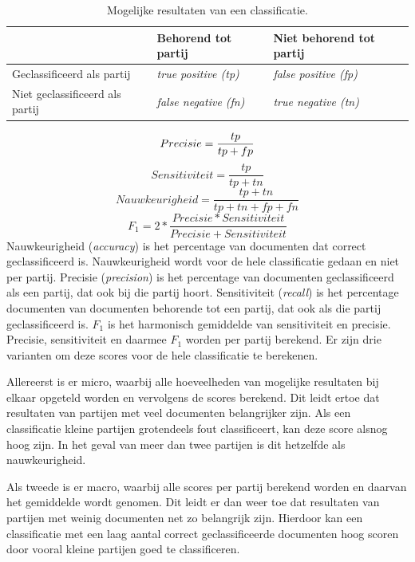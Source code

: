 \begin{table}[H]
\label{tab:scores}
\centering
\caption{Mogelijke resultaten van een classificatie.}
\begin{tabular}{l|l|l}
 & Behorend tot partij & Niet behorend tot partij\\ \hline
Geclassificeerd als partij &   \textit{true positive (tp)} & \textit{false positive (fp)} \\ \hline
Niet geclassificeerd als partij & \textit{false negative (fn)} & \textit{true negative (tn)} \\
\end{tabular}
\end{table}
\begin{equation}
    Precisie = \frac{tp}{tp + fp}\\
\end{equation}
\begin{equation}
    Sensitiviteit = \frac{tp}{tp + tn}
\end{equation}
\begin{equation}
    Nauwkeurigheid = \frac{tp + tn}{tp + tn + fp + fn}
\end{equation}
\begin{equation}
    F_1 = 2 * \frac{Precisie * Sensitiviteit}{Precisie + Sensitiviteit}
\end{equation}
Nauwkeurigheid (\textit{accuracy}) is het percentage van documenten dat correct geclassificeerd is. Nauwkeurigheid wordt voor de hele classificatie gedaan en niet per partij. Precisie (\textit{precision}) is het percentage van documenten geclassificeerd als een partij, dat ook bij die partij hoort. Sensitiviteit (\textit{recall}) is het percentage documenten van documenten behorende tot een partij, dat ook als die partij geclassificeerd is. $F_1$ is het harmonisch gemiddelde van sensitiviteit en precisie. Precisie, sensitiviteit en daarmee $F_1$ worden per partij berekend. Er zijn drie varianten om deze scores voor de hele classificatie te berekenen. \par
Allereerst is er micro, waarbij alle hoeveelheden van mogelijke resultaten bij elkaar opgeteld worden en vervolgens de scores berekend. Dit leidt ertoe dat resultaten van partijen met veel documenten belangrijker zijn. Als een classificatie kleine partijen grotendeels fout classificeert, kan deze score alsnog hoog zijn. In het geval van meer dan twee partijen is dit hetzelfde als nauwkeurigheid.\par 
Als tweede is er macro, waarbij alle scores per partij berekend worden en daarvan het gemiddelde wordt genomen. Dit leidt er dan weer toe dat resultaten van partijen met weinig documenten net zo belangrijk zijn. Hierdoor kan een classificatie met een laag aantal correct geclassificeerde documenten hoog scoren door vooral kleine partijen goed te classificeren.\par

